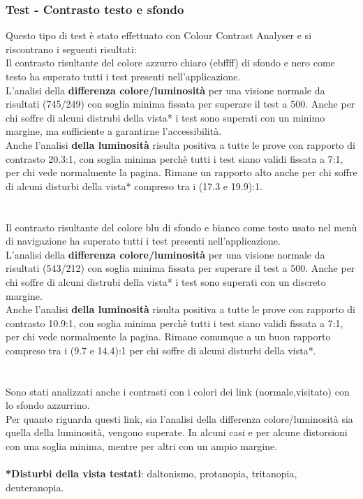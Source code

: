 	\subsubsection {Test - Contrasto testo e sfondo}
	Questo tipo di test \`e  stato effettuato con Colour Contrast Analyser e si riscontrano i seguenti risultati:
	\\ Il contrasto risultante del colore azzurro chiaro (ebffff) di sfondo e nero come testo ha superato tutti i test presenti nell'applicazione.
	\\ L'analisi della \textbf{differenza colore/luminosit\`a} per una visione normale da risultati (745/249) con soglia minima fissata per superare il test a 500. Anche per chi soffre di alcuni distrubi della vista* i test sono superati con un minimo margine, ma sufficiente a garantirne l'accessibilit\`a.
	\\ Anche l'analisi \textbf{della luminosit\`a} risulta positiva a tutte le prove con rapporto di contrasto 20.3:1, con soglia minima perchè tutti i test siano validi fissata a 7:1, per chi vede normalmente la pagina. Rimane un rapporto alto anche per chi soffre di alcuni disturbi della vista* compreso tra i (17.3 e 19.9):1.
	\\
	\\
	\\Il contrasto risultante del colore blu di sfondo e bianco come testo usato nel men\`u di navigazione ha superato tutti i test presenti nell'applicazione.
	\\ L'analisi della \textbf{differenza colore/luminosit\`a} per una visione normale da risultati (543/212) con soglia minima fissata per superare il test a 500. Anche per chi soffre di alcuni distrubi della vista* i test sono superati con un discreto margine.
	\\ Anche l'analisi \textbf{della luminosit\`a} risulta positiva a tutte le prove con rapporto di contrasto 10.9:1, con soglia minima perchè tutti i test siano validi fissata a 7:1, per chi vede normalmente la pagina. Rimane comunque a un buon rapporto compreso tra i (9.7 e 14.4):1 per chi soffre di alcuni disturbi della vista*.
	\\
	\\
	\\Sono stati analizzati anche i contrasti con i colori dei link (normale,visitato) con lo sfondo azzurrino.
	\\Per quanto riguarda questi link, sia l'analisi della differenza colore/luminosit\`a sia quella della luminosit\`a,  vengono superate. In alcuni casi e per alcune distorsioni con una soglia minima, mentre per altri con un ampio margine.
	\\ \\ \textbf{*Disturbi della vista testati}: daltonismo, protanopia, tritanopia, deuteranopia.

